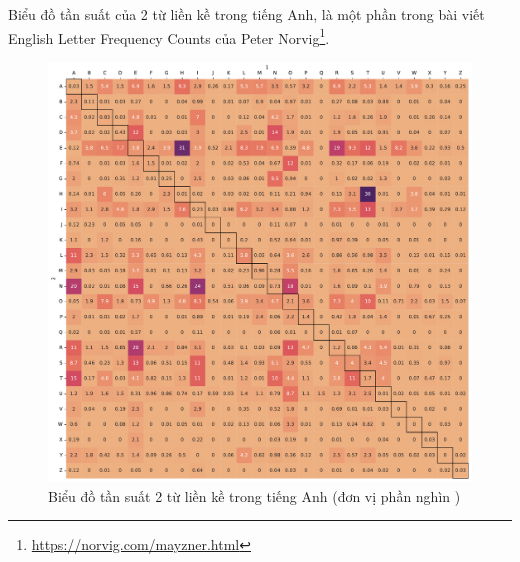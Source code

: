\newpage
Biểu đồ tần suất của 2 từ liền kề trong tiếng Anh, là một phần trong bài viết English Letter Frequency Counts của Peter Norvig\footnote{\url{https://norvig.com/mayzner.html}}.
\begin{figure}[htb]
    \centering
    \includegraphics[width=\textwidth]{chapter_2/image/norvig_bigram_frequency.pdf}
    \caption{Biểu đồ tần suất 2 từ liền kề trong tiếng Anh (đơn vị phần nghìn \textperthousand)}
    \label{figure:english_bigram_frequency}
\end{figure}

\newpage
